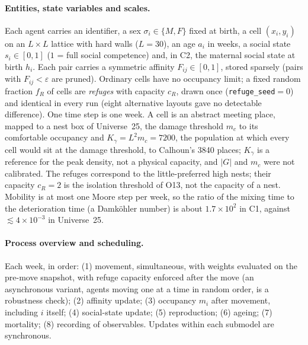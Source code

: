 \documentclass[pre,onecolumn,superscriptaddress,notitlepage]{revtex4-2}
\begin{document}
\paragraph{Entities, state variables and scales.}
Each agent carries an identifier, a sex $\sigma_i\in\{M,F\}$ fixed at birth, a cell $(x_i,y_i)$ on an $L\times L$
lattice with hard walls ($L=30$), an age $a_i$ in weeks, a social state $s_i\in[0,1]$ ($1$ = full social competence)
and, in \textsf{C2}, the maternal social state at birth $h_i$. Each pair carries a symmetric affinity
$F_{ij}\in[0,1]$, stored sparsely (pairs with $F_{ij}<\varepsilon$ are pruned). Ordinary cells have no occupancy
limit; a fixed random fraction $f_R$ of cells are \emph{refuges} with capacity $c_R$, drawn once
(\texttt{refuge\_seed}${}=0$) and identical in every run (eight alternative layouts gave no
detectable difference). One time step is one week. A cell is an abstract meeting place, mapped to a nest box of
Universe~25, the damage threshold $m_c$ to its comfortable occupancy and $K_\gamma=L^2m_c=7200$, the population at
which every cell would sit at the damage threshold, to Calhoun's 3840 places; $K_\gamma$ is a reference for the peak
density, not a physical capacity, and $|G|$ and $m_c$ were not calibrated. The refuges correspond to the
little-preferred high nests; their capacity $c_R=2$ is the isolation threshold of O13, not the capacity of a nest.
Mobility is at most one Moore step per week, so the ratio of the mixing time to the deterioration time (a
Damk\"ohler number) is about $1.7\times10^2$ in \textsf{C1}, against $\lesssim4\times10^{-3}$ in Universe~25.

\paragraph{Process overview and scheduling.}
Each week, in order: (1) movement, simultaneous, with weights evaluated on the pre-move snapshot, with refuge
capacity enforced after the move (an asynchronous variant, agents moving one at a time in random order, is a
robustness check); (2) affinity update; (3) occupancy $m_i$ after movement, including $i$ itself; (4) social-state
update; (5) reproduction; (6) ageing; (7) mortality; (8) recording of observables. Updates within each submodel are
synchronous.
\end{document}
